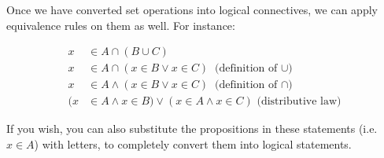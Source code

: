 \documentclass[a4paper, 11pt]{article}
\begin{document}
Once we have converted set operations into logical connectives, we can apply equivalence rules on them as well. For instance:

\begin{align*}
  x  & \in A \cap (B \cup C)                                                          \\
  x  & \in A \cap (x \in B \vee x \in C) \text{ (definition of $\cup$)}               \\
  x  & \in A \wedge (x \in B \vee x \in C) \text{ (definition of $\cap$)}             \\
  (x & \in A \wedge x \in B) \vee (x \in A \wedge x \in C) \text{ (distributive law)}
\end{align*}

If you wish, you can also substitute the propositions in these statements (i.e. $x \in A$) with letters, to completely convert them into logical statements.

\clearpage
\end{document}
